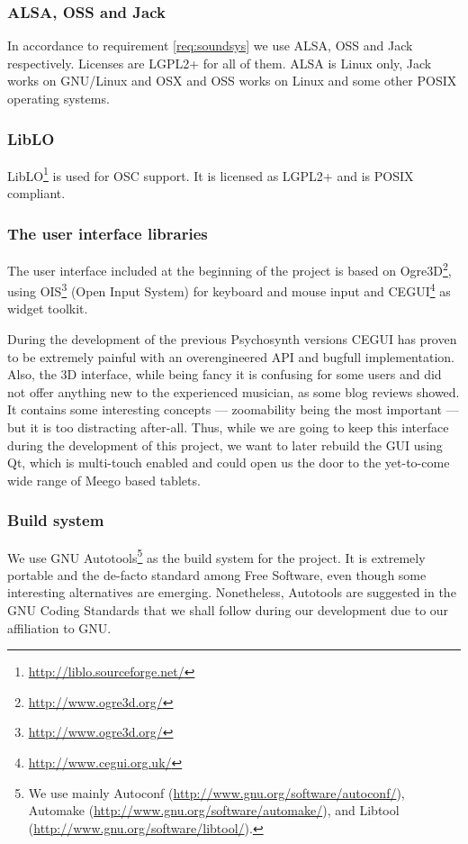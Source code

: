 \subsubsection{ALSA, OSS and Jack}

In accordance to requirement \ref{req:soundsys} we use ALSA, OSS and
Jack respectively. Licenses are LGPL2+ for all of them. ALSA is Linux
only, Jack works on GNU/Linux and OSX and OSS works on Linux and some
other POSIX operating systems.

\subsubsection{LibLO}

LibLO\footnote{\url{http://liblo.sourceforge.net/}} is used for OSC
support. It is licensed as LGPL2+ and is POSIX compliant.

\subsubsection{The user interface libraries}

The user interface included at the beginning of the project is based
on Ogre3D\footnote{\url{http://www.ogre3d.org/}}, using
OIS\footnote{\url{http://www.ogre3d.org/}} (Open Input System) for
keyboard and mouse input and
CEGUI\footnote{\url{http://www.cegui.org.uk/}} as widget toolkit.

During the development of the previous Psychosynth versions CEGUI has
proven to be extremely painful with an overengineered API and bugfull
implementation. Also, the 3D interface, while being fancy it is
confusing for some users and did not offer anything new to the
experienced musician, as some blog reviews showed. It contains some
interesting concepts --- zoomability being the most important --- but
it is too distracting after-all. Thus, while we are going to keep this
interface during the development of this project, we want to later
rebuild the GUI using Qt, which is multi-touch enabled and could open
us the door to the yet-to-come wide range of Meego based tablets.

\subsubsection{Build system}

We use GNU Autotools\footnote{We use mainly Autoconf
  (\url{http://www.gnu.org/software/autoconf/}), Automake
  (\url{http://www.gnu.org/software/automake/}), and Libtool
  (\url{http://www.gnu.org/software/libtool/}).} as the build system
for the project. It is extremely portable and the de-facto standard
among Free Software, even though some interesting alternatives are
emerging. Nonetheless, Autotools are suggested in the GNU Coding
Standards\cite{stallman10coding} that we shall follow during our
development due to our affiliation to GNU.

